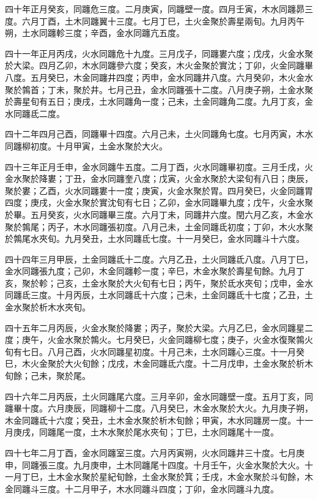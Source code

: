\begin{pinyinscope}
四十年正月癸亥，同躔危三度。二月庚寅，同躔壁一度。四月壬寅，木水同躔昴三度。六月丁酉，土木同躔翼十三度。七月丁巳，土火金聚於壽星兩旬。九月丙午朔，土水同躔軫三度；辛酉，金水同躔亢五度。

四十一年正月丙戌，火水同躔危十九度。三月戊子，同躔婁六度；戊戌，火金水聚於大梁。四月乙卯，木水同躔參六度；癸亥，木火金聚於實沈；丁卯，火金同躔畢八度。五月癸巳，木金同躔井四度；丙申，金水同躔井八度。六月癸卯，木火金水聚於鶉首；丁未，聚於井。七月己丑，金水同躔張十二度。八月庚子朔，土金水聚於壽星旬有五日；庚戌，土水同躔角一度；己未，土金同躔角二度。九月丁亥，金水同躔氐二度。

四十二年四月己酉，同躔畢十四度。六月己未，土火同躔角七度。七月丙寅，木水同躔柳初度。十月甲寅，土金水聚於大火。

四十三年正月壬申，金水同躔牛五度。二月丁酉，火水同躔畢初度。三月壬戌，火金水聚於降婁；丁丑，金水同躔奎八度；戊寅，火金水聚於大梁旬有八日；庚辰，聚於婁；乙酉，火水同躔婁十一度；庚寅，火金水聚於胃。四月癸巳，火金同躔胃四度；庚戌，火金水聚於實沈旬有七日；乙卯，金水同躔畢九度；戊午，火金水聚於畢。五月癸亥，火水同躔畢三度。六月丁未，同躔井六度。閏六月乙亥，木金水聚於鶉尾；丙子，木水同躔張初度。八月己未，土金同躔氐初度；丁卯，木火水聚於鶉尾水夾旬。九月癸丑，土水同躔氐七度。十一月癸巳，金水同躔斗十六度。

四十四年三月甲辰，土金同躔氐十二度。六月乙丑，土火同躔氐八度。八月丁巳，金水同躔張九度；己卯，木金同躔軫一度；辛巳，木金水聚於壽星旬餘。九月丁亥，聚於軫；己亥，土金水聚於大火旬有七日；丙午，聚於氐水夾旬；戊申，金水同躔氐三度。十月丙辰，土水同躔氐十六度；己未，土金同躔氐十七度；乙丑，土金水聚於析木水夾旬。

四十五年二月丙辰，火金水聚於降婁；丙子，聚於大梁。六月乙巳，金水同躔星二度；庚午，火金水聚於鶉火。七月癸巳，火金同躔柳七度；庚子，火金水復聚鶉火旬有七日。八月己酉，火水同躔星初度。十月己未，土水同躔心三度。十一月癸巳，木火金聚於大火旬餘；戊戌，木金同躔氐六度。十二月戊申，土金水聚於析木旬餘；己未，聚於尾。

四十六年二月丙辰，土火同躔尾六度。三月辛卯，金水同躔壁一度。五月丁亥，同躔畢十度。六月庚辰，同躔柳十二度。八月癸巳，木金水聚於大火。九月庚子朔，木金同躔氐十六度；癸丑，土木金水聚於析木旬餘；甲寅，木水同躔房一度。十一月庚戌，同躔尾一度，土木水聚於尾水夾旬；丁巳，土水同躔尾十一度。

四十七年二月丁酉，金水同躔室三度。六月丙寅朔，火水同躔井三十度。七月庚申，同躔張三度。九月庚申，土木同躔尾十四度。十月壬午，火金水聚於大火。十一月丁巳，土木金水聚於星紀旬餘，土金水聚於箕；壬戌，木金水聚於斗旬餘，木金同躔斗三度。十二月甲子，木水同躔斗四度；丁卯，金水同躔斗九度。


\end{pinyinscope}

